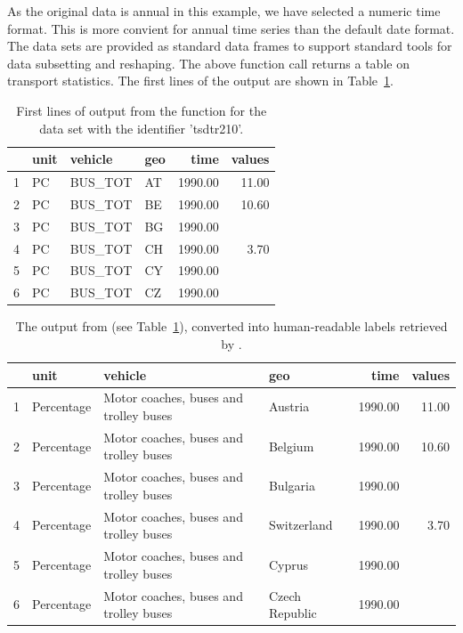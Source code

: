 As the original data is annual in this example, we have selected a
numeric time format. This is more convient for annual time series than
the default date format. The data sets are provided as standard data
frames to support standard tools for data subsetting and
reshaping. The above function call returns a table on transport
statistics.  The first lines of the output are shown in
Table~\ref{tab:getdatatable}.

\begin{table}[ht!]
\centering
\begin{tabular}{rlllrr}
\toprule
  \hline
 & unit & vehicle & geo & time & values \\ 
  \hline
  1 & PC & BUS\_TOT & AT & 1990.00 & 11.00 \\ 
  2 & PC & BUS\_TOT & BE & 1990.00 & 10.60 \\ 
  3 & PC & BUS\_TOT & BG & 1990.00 &  \\ 
  4 & PC & BUS\_TOT & CH & 1990.00 & 3.70 \\ 
  5 & PC & BUS\_TOT & CY & 1990.00 &  \\ 
  6 & PC & BUS\_TOT & CZ & 1990.00 &  \\ 
   \hline
\bottomrule   
\end{tabular}
\caption{First lines of output from the  function for the data set with the identifier 'tsdtr210'.}
\label{tab:getdatatable}
\end{table}

\begin{table}[h!]
\centering
\begin{tabular}{rlllrr}
\toprule
  \hline
  & unit & vehicle & geo & time & values \\ 
  \hline
  1 & Percentage & Motor coaches, buses and trolley buses & Austria & 1990.00 & 11.00 \\ 
  2 & Percentage & Motor coaches, buses and trolley buses & Belgium & 1990.00 & 10.60 \\ 
  3 & Percentage & Motor coaches, buses and trolley buses & Bulgaria & 1990.00 &  \\ 
  4 & Percentage & Motor coaches, buses and trolley buses & Switzerland & 1990.00 & 3.70 \\ 
  5 & Percentage & Motor coaches, buses and trolley buses & Cyprus & 1990.00 &  \\ 
  6 & Percentage & Motor coaches, buses and trolley buses & Czech Republic & 1990.00 &  \\ 
   \hline 
\bottomrule     
\end{tabular}
\caption{The output from  (see Table~\ref{tab:getdatatable}), converted into human-readable labels retrieved by .}
\label{tab:getdatatable2}
\end{table}

